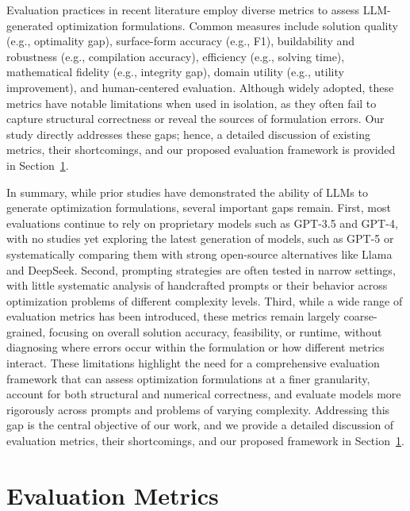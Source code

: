\documentclass[review,12pt]{elsarticle}
\begin{document}
Evaluation practices in recent literature employ diverse metrics to assess LLM-generated optimization formulations. Common measures include solution quality (e.g., optimality gap), surface-form accuracy (e.g., F1), buildability and robustness (e.g., compilation accuracy), efficiency (e.g., solving time), mathematical fidelity (e.g., integrity gap), domain utility (e.g., utility improvement), and human-centered evaluation. Although widely adopted, these metrics have notable limitations when used in isolation, as they often fail to capture structural correctness or reveal the sources of formulation errors. Our study directly addresses these gaps; hence, a detailed discussion of existing metrics, their shortcomings, and our proposed evaluation framework is provided in Section~\ref{sec:evaluationMetrics}. 

In summary, while prior studies have demonstrated the ability of LLMs to generate optimization formulations, several important gaps remain. First, most evaluations continue to rely on proprietary models such as GPT-3.5 and GPT-4, with no studies yet exploring the latest generation of models, such as GPT-5 or systematically comparing them with strong open-source alternatives like Llama and DeepSeek. Second, prompting strategies are often tested in narrow settings, with little systematic analysis of handcrafted prompts or their behavior across optimization problems of different complexity levels. Third, while a wide range of evaluation metrics has been introduced, these metrics remain largely coarse-grained, focusing on overall solution accuracy, feasibility, or runtime, without diagnosing where errors occur within the formulation or how different metrics interact. These limitations highlight the need for a comprehensive evaluation framework that can assess optimization formulations at a finer granularity, account for both structural and numerical correctness, and evaluate models more rigorously across prompts and problems of varying complexity. Addressing this gap is the central objective of our work, and we provide a detailed discussion of evaluation metrics, their shortcomings, and our proposed framework in Section~\ref{sec:evaluationMetrics}.


\vspace{-3mm}
\section{Evaluation Metrics}\label{sec:evaluationMetrics}
\end{document}
